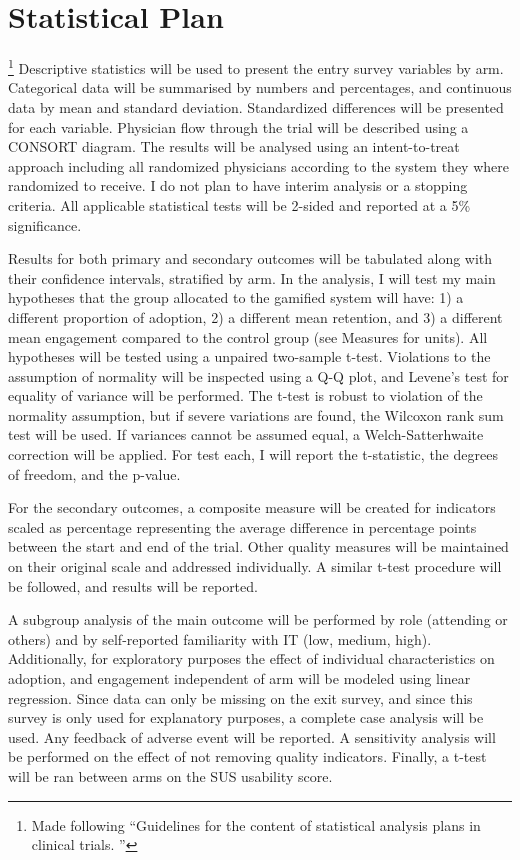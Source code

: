 \section{Statistical Plan}\footnote{Made following ``Guidelines for the content of statistical analysis plans in clinical trials. \cite{gamble2017guidelines}''}
Descriptive statistics will be used to present the entry survey variables by arm. Categorical data will be summarised by numbers and percentages, and continuous data by mean and standard deviation. Standardized differences will be presented for each variable. Physician flow through the trial will be described using a CONSORT diagram.
The results will be analysed using an intent-to-treat approach including all randomized physicians according to the system they where randomized to receive. I do not plan to have interim analysis or a stopping criteria. All applicable statistical tests will be 2-sided and reported at a 5\% significance.

Results for both primary and secondary outcomes will be tabulated along with their confidence intervals, stratified by arm. In the analysis, I will test my main hypotheses that the group allocated to the gamified system will have: 1) a different proportion of adoption, 2) a different mean retention, and 3) a different mean engagement compared to the control group (see Measures for units). All hypotheses will be tested using a unpaired two-sample t-test. Violations to the assumption of normality will be inspected using a Q-Q plot, and Levene's test for equality of variance will be performed. The t-test is robust to violation of the normality assumption, but if severe variations are found, the Wilcoxon rank sum test will be used. If variances cannot be assumed equal, a Welch-Satterhwaite correction will be applied. For test each, I will report the t-statistic, the degrees of freedom, and the p-value.

For the secondary outcomes, a composite measure will be created for indicators scaled as percentage representing the average difference in percentage points between the start and end of the trial. Other quality measures will be maintained on their original scale and addressed individually. A similar t-test procedure will be followed, and results will be reported.

A subgroup analysis of the main outcome will be performed by role (attending or others) and by self-reported familiarity with IT (low, medium, high). Additionally, for exploratory purposes the effect of individual characteristics on adoption, and engagement independent of arm will be modeled using linear regression. Since data can only be missing on the exit survey, and since this survey is only used for explanatory purposes, a complete case analysis will be used. Any feedback of adverse event will be reported. A sensitivity analysis will be performed on the effect of not removing quality indicators. Finally, a t-test will be ran between arms on the SUS usability score.

